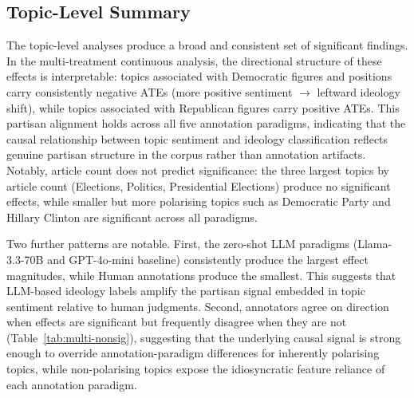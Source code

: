 \subsection{Topic-Level Summary}
\label{sec:causal-summary-topic}

The topic-level analyses produce a broad and consistent set of significant findings. In the multi-treatment continuous analysis, the directional structure of these effects is interpretable: topics associated with Democratic figures and positions carry consistently negative ATEs (more positive sentiment $\to$ leftward ideology shift), while topics associated with Republican figures carry positive ATEs. This partisan alignment holds across all five annotation paradigms, indicating that the causal relationship between topic sentiment and ideology classification reflects genuine partisan structure in the corpus rather than annotation artifacts. Notably, article count does not predict significance: the three largest topics by article count (Elections, Politics, Presidential Elections) produce no significant effects, while smaller but more polarising topics such as Democratic Party and Hillary Clinton are significant across all paradigms.

Two further patterns are notable. First, the zero-shot LLM paradigms (Llama-3.3-70B and GPT-4o-mini baseline) consistently produce the largest effect magnitudes, while Human annotations produce the smallest. This suggests that LLM-based ideology labels amplify the partisan signal embedded in topic sentiment relative to human judgments. Second, annotators agree on direction when effects are significant but frequently disagree when they are not (Table~\ref{tab:multi-nonsig}), suggesting that the underlying causal signal is strong enough to override annotation-paradigm differences for inherently polarising topics, while non-polarising topics expose the idiosyncratic feature reliance of each annotation paradigm.

